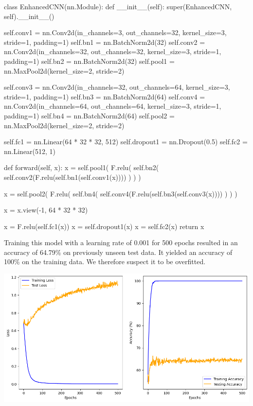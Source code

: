 \begin{python}
    class EnhancedCNN(nn.Module):
        def __init__(self):
            super(EnhancedCNN, self).__init__()

            self.conv1 = nn.Conv2d(in_channels=3, out_channels=32,
             kernel_size=3, stride=1, padding=1)
            self.bn1 = nn.BatchNorm2d(32)
            self.conv2 = nn.Conv2d(in_channels=32, out_channels=32,
             kernel_size=3, stride=1, padding=1)
            self.bn2 = nn.BatchNorm2d(32)
            self.pool1 = nn.MaxPool2d(kernel_size=2, stride=2)

            self.conv3 = nn.Conv2d(in_channels=32, out_channels=64,
            kernel_size=3, stride=1, padding=1)
            self.bn3 = nn.BatchNorm2d(64)
            self.conv4 = nn.Conv2d(in_channels=64, out_channels=64,
            kernel_size=3, stride=1, padding=1)
            self.bn4 = nn.BatchNorm2d(64)
            self.pool2 = nn.MaxPool2d(kernel_size=2, stride=2)

            self.fc1 = nn.Linear(64 * 32 * 32, 512)
            self.dropout1 = nn.Dropout(0.5)
            self.fc2 = nn.Linear(512, 1)

        def forward(self, x):
            x = self.pool1(
                F.relu(
                    self.bn2(
                        self.conv2(F.relu(self.bn1(self.conv1(x))))
                    )
                )
            )

            x = self.pool2(
                F.relu(
                    self.bn4(
                        self.conv4(F.relu(self.bn3(self.conv3(x))))
                    )
                )
            )

            x = x.view(-1, 64 * 32 * 32)

            x = F.relu(self.fc1(x))
            x = self.dropout1(x)
            x = self.fc2(x)
            return x
\end{python}

Training this model with a learning rate of 0.001 for 500 epochs resulted in an
accuracy of 64.79\% on previously unseen test data. It yielded an accuracy of
100\% on the training data. We therefore suspect it to be overfitted.

\includegraphics*[width=\textwidth]{Figures/EnhancedCNN_LR0.001_500.png}

